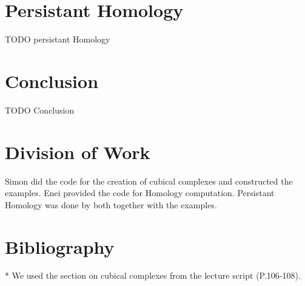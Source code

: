 \documentclass{article}
\begin{document}
    \section{Persistant Homology}
    TODO persistant Homology

    \section{Conclusion}
    TODO Conclusion

    \section{Division of Work}
    Simon did the code for the creation of cubical complexes and constructed the examples.
    Enei provided the code for Homology computation.
    Persistant Homology was done by both together with the examples.

    \section{Bibliography}*
    We used the section on cubical complexes from the lecture script (P.106-108).
\end{document}
